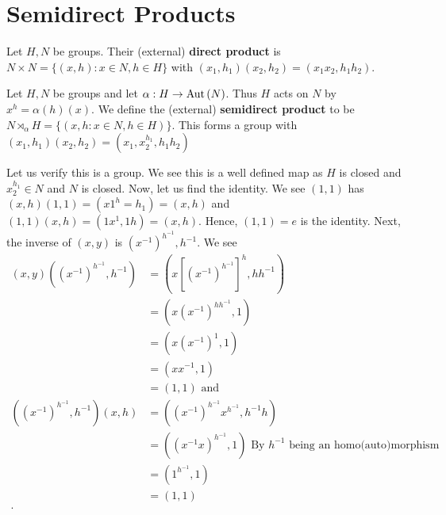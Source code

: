 \section{Semidirect Products}
\begin{definition}
	Let \(H, N\) be groups. Their (external) \textbf{direct product}  is \(N \times N = \{\left( x, h \right) :  x \in N, h \in H\} \) with \(\left( x_1, h_1 \right) \left( x_2, h_2 \right)  = \left( x_1 x_2 , h_1 h_2 \right)  \).
\end{definition}
\begin{definition}
Let \(H, N\)  be groups and let \(\alpha : H \to \operatorname{Aut} \left( N \right) \). Thus \(H\) acts on \(N\) by \(x^{h} = \alpha \left( h \right) \left( x \right) \). We define the (external) \textbf{semidirect product} to be \(N \rtimes_{\alpha} H = \{\left( x, h : x \in N, h \in H\right) \} \). This forms a group with \(\left( x_1, h_1 \right)  \left( x_2, h_2 \right)  = \left( x_1, x_2 ^{h_1}, h_1 h_2 \right) \)
\end{definition}
Let us verify this is  a group. We see this is a well defined map as \(H\) is closed and \(x_2^{h_1} \in N\) and \(N\) is closed. Now, let us find the identity. We see \(\left( 1, 1 \right) \) has \(\left( x,h  \right) \left( 1, 1 \right) = \left( x1^{h} = h_1 \right)  =  \left( x, h\right) \) and \(\left( 1, 1 \right) \left( x, h \right)  = \left( 1x^{1}, 1h \right)  = \left( x,h \right) \). Hence, \(\left( 1, 1 \right) = e\) is the identity. Next, the inverse of \(\left( x, y \right) \) is \(\left( x^{-1} \right) ^{h^{-1}}, h^{-1}\). We see
\begin{align*}
\left( x, y \right) \left( \left( x^{-1} \right)^{h^{-1}}, h^{-1}  \right) &=  \left( x\left[\left( x^{-1} \right)^{h^{-1}} \right] ^{h}, h h^{-1} \right)  \\
									   &=  \left( x \left( x^{-1} \right)^{h h^{-1}}, 1  \right)  \\
									   &= \left( x \left( x^{-1} \right) ^{1}, 1 \right)  \\
									   &= \left( x x^{-1}, 1 \right)  \\
									   &= \left( 1, 1 \right)  \text{ and }\\
\left( \left( x^{-1} \right) ^{h^{-1}} , h^{-1} \right) \left( x, h \right)  &=  \left( \left( x^{-1} \right)^{h^{-1}} x^{h^{-1}}, h^{-1} h  \right) \\
									     &= \left( \left( x^{-1} x \right) ^{h^{-1}}, 1 \right)  \text{ By \(h^{-1}\) being an homo(auto)morphism}\\
									     &= \left( 1^{h^{-1}}, 1 \right)  \\
									     &= \left(1, 1\right) \\
.\end{align*}
